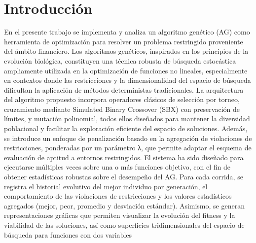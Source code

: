 \chapter{Introducción}
En el presente trabajo se implementa y analiza un algoritmo genético (AG) como herramienta de optimización para resolver un problema restringido proveniente del ámbito financiero. Los algoritmos genéticos, inspirados en los principios de la evolución biológica, constituyen una técnica robusta de búsqueda estocástica ampliamente utilizada en la optimización de funciones no lineales, especialmente en contextos donde las restricciones y la dimensionalidad del espacio de búsqueda dificultan la aplicación de métodos deterministas tradicionales.
La arquitectura del algoritmo propuesto incorpora operadores clásicos de selección por torneo, cruzamiento mediante Simulated Binary Crossover (SBX) con preservación de límites, y mutación polinomial, todos ellos diseñados para mantener la diversidad poblacional y facilitar la exploración eficiente del espacio de soluciones. Además, se introduce un enfoque de penalización basado en la agregación de violaciones de restricciones, ponderadas por un parámetro λ, que permite adaptar el esquema de evaluación de aptitud a entornos restringidos.
El sistema ha sido diseñado para ejecutarse múltiples veces sobre una o más funciones objetivo, con el fin de obtener estadísticas robustas sobre el desempeño del AG. Para cada corrida, se registra el historial evolutivo del mejor individuo por generación, el comportamiento de las violaciones de restricciones y los valores estadísticos agregados (mejor, peor, promedio y desviación estándar). Asimismo, se generan representaciones gráficas que permiten visualizar la evolución del fitness y la viabilidad de las soluciones, así como superficies tridimensionales del espacio de búsqueda para funciones con dos variables
